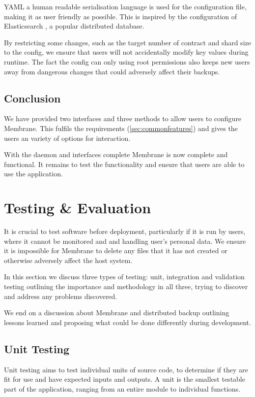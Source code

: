 \documentclass[11pt, a4paper, twocolumn, twoside]{report}
\begin{document}
YAML a human readable serialisation language \citep{evans2009yaml} is used for the configuration file, making it as user friendly as possible. This is inspired by the configuration of Elasticsearch \citep{elastic2017config}, a popular distributed database.

By restricting some changes, such as the target number of contract and shard size to the config, we ensure that users will not accidentally modify key values during runtime. The fact the config can only using root permissions also keeps new users away from dangerous changes that could adversely affect their backups.

\section{Conclusion}

We have provided two interfaces and three methods to allow users to configure Membrane. This fulfils the requirements (\ref{sec:commonfeatures}) and gives the users an variety of options for interaction.

With the daemon and interfaces complete Membrane is now complete and functional. It remains to test the functionality and ensure that users are able to use the application.

\chapter{Testing \& Evaluation}

It is crucial to test software before deployment, particularly if it is run by users, where it cannot be monitored and and handling user's personal data. We ensure it is impossible for Membrane to delete any files that it has not created or otherwise adversely affect the host system.

In this section we discuss three types of testing: unit, integration and validation testing outlining the importance and methodology in all three, trying to discover and address any problems discovered.

We end on a discussion about Membrane and distributed backup outlining lessons learned and proposing what could be done differently during development.

\section{Unit Testing}

Unit testing aims to test individual units of source code, to determine if they are fit for use and have expected inputs and outputs. \citep{huizinga2007automated} A unit is the smallest testable part of the application, ranging from an entire module to individual functions.
\end{document}
